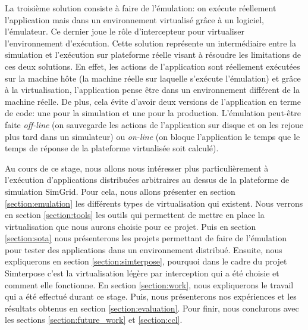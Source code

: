 La troisième solution consiste à faire de l'émulation: on exécute réellement
l'application mais dans un environnement virtualisé grâce à un logiciel,
l'émulateur. Ce dernier joue le rôle d'intercepteur pour virtualiser
l'environnement d'exécution.
Cette solution représente un intermédiaire entre la simulation et l'exécution
sur plateforme réelle visant à résoudre les limitations de ces deux
solutions. En effet, les actions de l'application sont réellement exécutées sur
la machine hôte (la machine réelle sur laquelle s'exécute l'émulation) et grâce
à la virtualisation, l'application pense être dans un environnement différent de
la machine réelle. De plus, cela évite d'avoir deux versions de l'application en
terme de code: une pour la simulation et une pour la production. L'émulation
peut-être faite \textit{off-line} (on sauvegarde les actions de l'application
sur disque et on les rejoue plus tard dans un simulateur) ou \textit{on-line}
(on bloque l'application le temps que le temps de réponse de la plateforme
virtualisée soit calculé).


Au cours de ce stage, nous allons nous intéresser plus particulièrement à
l'exécution d'applications distribuées arbitraires au dessus de la plateforme de
simulation SimGrid. Pour cela, nous allons présenter en section
\ref{section:emulation} les différents types de virtualisation qui
existent. Nous verrons en section \ref{section:tools} les outils qui permettent
de mettre en place la virtualisation que nous aurons choisie pour ce
projet. Puis en section \ref{section:sota} nous présenterons les projets
permettant de faire de l'émulation pour tester des applications dans un
environnement distribué. Ensuite, nous expliquerons en section
\ref{section:simterpose}, pourquoi dans le cadre du projet Simterpose c'est la
virtualisation légère par interception qui a été choisie et comment elle
fonctionne. En section \ref{section:work}, nous expliquerons le travail qui a
été effectué durant ce stage. Puis, nous présenterons nos expériences et les
résultats obtenus en section \ref{section:evaluation}. Pour finir, nous
conclurons avec les sections \ref{section:future_work} et \ref{section:ccl}.
